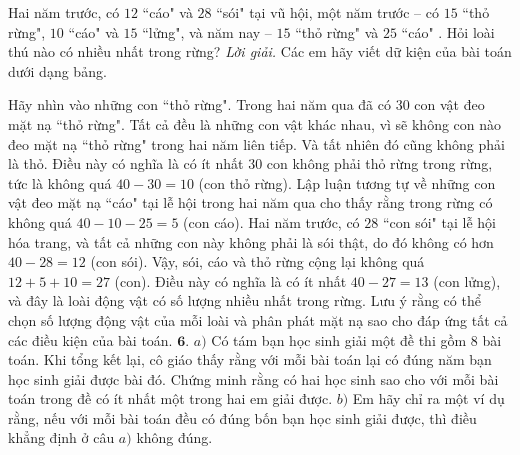 \begin{multicols}{2}
\begin{figure}[H]
		\vspace*{-20pt}
	\end{figure}
	Hai năm trước, có $12$ ``cáo" và $28$ ``sói" tại vũ hội, một năm trước -- có $15$ ``thỏ rừng", $10$ ``cáo" và $15$ ``lửng", và năm nay -- $15$ ``thỏ rừng" và $25$ ``cáo" . Hỏi loài thú nào có nhiều nhất trong rừng? 
	\vskip 0.1cm
	\textit{Lời giải.} Các em hãy viết dữ kiện của bài toán dưới dạng bảng.
	\begin{table}[H]
		\renewcommand{\arraystretch}{1.2}
	\end{table}
	Hãy nhìn vào những con ``thỏ rừng". Trong hai năm qua đã có $30$ con vật đeo mặt nạ ``thỏ rừng". Tất cả đều là những con vật khác nhau, vì sẽ không con nào đeo mặt nạ ``thỏ rừng" trong hai năm liên tiếp. Và tất nhiên đó cũng không phải là thỏ. Điều này có nghĩa là có ít nhất $30$ con không phải thỏ rừng trong rừng, tức là không quá $40 - 30 = 10$ (con thỏ rừng). Lập luận tương tự về những con vật đeo mặt nạ ``cáo" tại lễ hội trong hai năm qua cho thấy rằng trong rừng có không quá $40 - 10 - 25 = 5$ (con cáo). Hai năm trước, có $28$ ``con sói" tại lễ hội hóa trang, và tất cả những con này không phải là sói thật, do đó không có hơn $40 - 28 = 12$ (con sói). Vậy, sói, cáo và thỏ rừng cộng lại không quá $12 + 5 + 10 = 27$ (con). Điều này có nghĩa là có ít nhất $40 - 27 = 13$ (con lửng), và đây là loài động vật có số lượng nhiều nhất trong rừng.
	\vskip 0.1cm
	Lưu ý rằng có thể chọn số lượng động vật của mỗi loài và phân phát mặt nạ sao cho đáp ứng tất cả các điều kiện của bài toán.
	\vskip 0.1cm
	$\pmb{6.}$ $a)$	Có tám bạn học sinh giải một đề thi gồm $8$ bài toán. Khi tổng kết lại, cô giáo thấy rằng với mỗi bài toán lại có đúng  năm bạn học sinh giải được bài đó. Chứng minh rằng có hai học sinh sao cho với mỗi bài toán trong đề có ít nhất một trong hai em giải được.
	\vskip 0.1cm
	$b)$	Em hãy chỉ ra một ví dụ rằng, nếu với mỗi bài toán đều có đúng bốn bạn học sinh giải được, thì điều khẳng định ở câu $a)$ không đúng.

\end{multicols}
